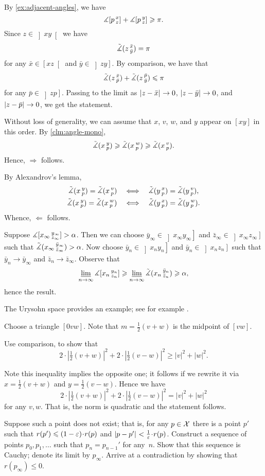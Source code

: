 By \ref{ex:adjacent-angles}, we have
\[\measuredangle[p\,{}^{x}_{z}]+\measuredangle[p\,{}^{y}_{z}]\geqslant \pi.\]
Since $z\in \left]xy\right[$ we have 
\[\tilde\measuredangle(z\,{}^{\bar x}_{\bar y})=\pi\]
for any $\bar x\in \left[xz\right[$ and $\bar y\in \left]zy\right]$.
By comparison, we have that 
\[\tilde\measuredangle(z\,{}^{\bar x}_{\bar p})+\tilde\measuredangle(z\,{}^{\bar p}_{\bar y})\leqslant\pi\]
for any $\bar p\in \left]zp\right]$.
Passing to the limit as
$|{z}-{\bar x}|_{}^{{}}\to 0$,
$|{z}-{\bar y}|_{}^{{}}\to 0$, and
$|{z}-{\bar p}|_{}^{{}}\to 0$,
we get the statement.

Without loss of generality, we can assume that $x$, $v$, $w$, and $y$ appear on 
$[xy]$ in this order.
By \ref{clm:angle-mono},
\[
\tilde\measuredangle(x\,{}^{y}_{p})\geqslant \tilde\measuredangle(x\,{}^{w}_{p}) \geqslant\tilde\measuredangle(x\,{}^{v}_{p}).
\]
Hence, $\Rightarrow$ follows.

By Alexandrov's lemma,
\begin{align*}
\tilde\measuredangle(x\,{}^{y}_{p})=\tilde\measuredangle(x\,{}^{v}_{p})
\quad&\Longleftrightarrow\quad
\tilde\measuredangle(y\,{}^{x}_{p})=\tilde\measuredangle(y\,{}^{v}_{p}),
\\
\tilde\measuredangle(x\,{}^{y}_{p})=\tilde\measuredangle(x\,{}^{w}_{p})
\quad&\Longleftrightarrow\quad
\tilde\measuredangle(y\,{}^{x}_{p})=\tilde\measuredangle(y\,{}^{w}_{p}).
\end{align*}
Whence, $\Leftarrow$ follows.

 Suppose $\measuredangle [x_\infty\,{}^{y_\infty}_{z_\infty}]>\alpha$.
Then we can choose $\bar y_\infty\in\left]x_\infty y_\infty\right]$
and $\bar z_\infty\in\left]x_\infty z_\infty\right]$ such that 
$\tilde\measuredangle(x_\infty\,{}^{\bar y_\infty}_{\bar z_\infty})>\alpha$.
Now choose $\bar y_n\in\left]x_n y_n\right]$ and $\bar y_n\in\left]x_n z_n\right]$ such that $\bar y_n\to \bar y_\infty$ and $\bar z_n\to \bar z_\infty$.
Observe that 
\[\varliminf_{n\to\infty}\measuredangle [x_n\,{}^{y_n}_{z_n}]\geqslant\varliminf_{n\to\infty}\tilde\measuredangle(x_n\,{}^{\bar y_n}_{\bar z_n}) \geqslant \alpha,\]
hence the result.

The Urysohn space provides an example;
see for example \cite[Lecture 2]{petrunin2023pure}.

Choose a triangle $[0vw]$.
Note that $m=\tfrac12(v+w)$ is the midpoint of $[vw]$.

Use comparison, to show that
\[2\cdot |\tfrac12(v+w)|^2+2\cdot |\tfrac12(v-w)|^2\ge |v|^2+|w|^2.\]

Note this inequality implies the opposite one;
it follows if we rewrite it via $x=\tfrac12(v+w)$ and $y=\tfrac12(v-w)$.
Hence we have 
\[2\cdot |\tfrac12(v+w)|^2+2\cdot |\tfrac12(v-w)|^2= |v|^2+|w|^2\]
for any $v,w$.
That is, the norm is quadratic and the statement follows.

Suppose such a point does not exist;
that is, for any $p\in \mathcal{X}$ there is a point $p'$ such that $r(p')\le  (1-\eps)\cdot r(p)$ and $\dist p{p'}{}<\tfrac{1}{\eps}\cdot r(p)$.
Construct a sequence of points $p_0,p_1,\dots$ such that $p_n=p_{n-1}'$ for any~$n$.
Show that this sequence is Cauchy; denote its limit by $p_\infty$.
Arrive at a contradiction by showing that $r(p_\infty)\le0$.

